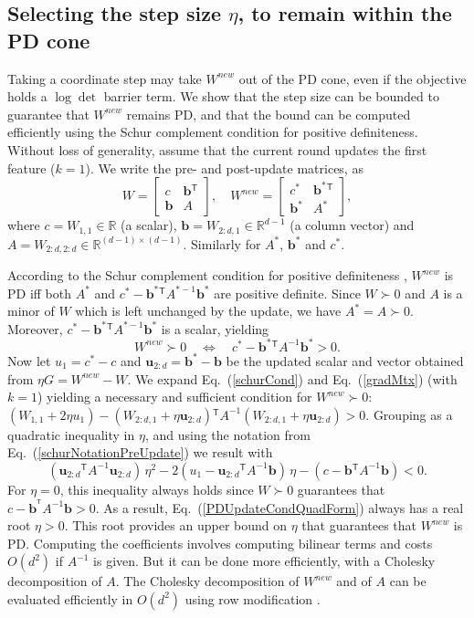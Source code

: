 \documentclass[twoside,11pt]{article}
\newcommand\mat[1]{{#1}}
\renewcommand\vec[1]{\mathbf{#1}}
\newcommand{\T}{{}^\mathsf{T}}
\newcommand{\W}{\mat{W}}
\newcommand{\newW}{{\mat{W^{new}}}}
\newcommand{\R}{\mathbb{R}}
\newcommand{\A}{\mat{A}}
\newcommand{\B}{\vec{b}}
\newcommand{\C}{c}
\newcommand{\invA}{A^{-1}}
\newcommand{\uscalar}{{u}_{1}}
\newcommand{\uvec}{\vec{u}_{2:d}}
\newcommand{\Wvec}{\W_{2:d,1}}
\newcommand{\Wscalar}{\W_{1,1}}
\renewcommand{\eqref}[1]{Eq.~(\ref{#1})}
\begin{document}
\subsection{Selecting the step size $\eta$, to remain within the PD cone}\label{subsec:step}
Taking a coordinate step may take $\newW$ out of the PD cone, even if the objective holds a $\log\det$ barrier term. We show that the step size can be bounded to guarantee that $\newW$ remains PD, and that the bound can be computed efficiently using the Schur complement condition for positive definiteness. Without loss of generality, assume that the current round updates the first feature ($k = 1$). We write the pre- and post-update
matrices, as
\begin{equation}
  \W = \left[ \begin{matrix} \C & \B\T \\ \B & A \end{matrix} \right],
  \quad
  \newW = \left[ \begin{matrix} \C^* & \B^*\T \\ \B^* & A^* \end{matrix} \right],
  \label{schurNotationPreUpdate}
\end{equation}
 where $\C = \Wscalar \in \R$ (a scalar), $\B = \Wvec \in
\R^{d-1}$ (a column vector) and $A = \W_{2:d,2:d} \in \R^{(d-1)
\times (d-1)}$. Similarly for $A^*$, $\B^*$ and $\C^*$.

According to the Schur complement condition for positive definiteness
\citep[p. 650]{boyd2004convex}, $\newW$ is PD iff both
$A^*$ and $\C^* - \B^*\T A^{*-1} \B^*$ are positive definite.
Since $W \succ 0$ and $A$ is a minor of $\W$ which is left unchanged by the update, we have $A^* =
A \succ 0$. Moreover, $\C^* - \B^*\T A^{*-1} \B^*$ is a
scalar, yielding
\begin{equation}
  \newW \succ  0 \quad \Leftrightarrow \quad  \C^* - \B^*\T \invA \B^* >  0.
  \label{schurCond}
\end{equation}
Now let $\uscalar = \C^* - \C$ and $\uvec = \B^* - \B$ be the updated scalar and vector
obtained from $\eta G = \newW - \W$. We expand \eqref{schurCond} and
\eqref{gradMtx} (with $k=1$) yielding a necessary and sufficient condition for $\newW \succ 0$: $(\Wscalar + 2\eta \uscalar)-(\Wvec + \eta \uvec)\T \invA (\Wvec + \eta \uvec)   > 0$.
Grouping as a quadratic inequality in $\eta$, and using the notation from \eqref{schurNotationPreUpdate} we result with
\begin{equation}
\label{PDUpdateCondQuadForm}
(\uvec\T \invA \uvec) \, \eta^2 
-2(\uscalar - \uvec\T \invA \B) \,\eta 
-(\C - \B\T  \invA \B) < 0 .
\end{equation}
For $\eta = 0$, this inequality always
holds since $\W \succ 0$ guarantees that $\C-\B^{\T} \invA \B >0$. As a result,
 \eqref{PDUpdateCondQuadForm} always has a real
root $\eta > 0$. This root provides an upper bound on $\eta$ that guarantees that $\newW$ is PD. Computing the coefficients involves computing bilinear terms and costs $O(d^2)$ if $\invA$ is given. But it can be done more efficiently, with a Cholesky decomposition of $\A$. The Cholesky decomposition of $\newW$ and of $\A$ can be evaluated efficiently in $O(d^2)$ using row modification \citep{Davis05rowchol, CHOLMOD}.
\end{document}
